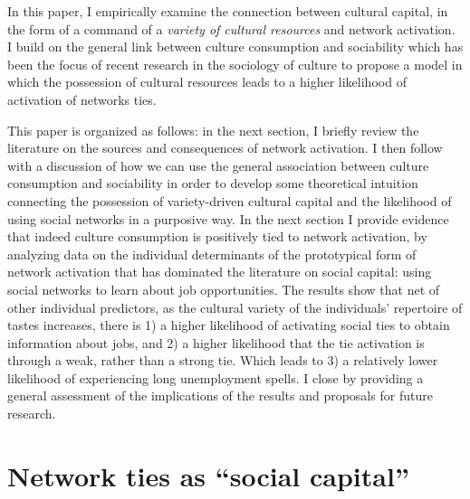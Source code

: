 \documentclass[12pt]{article}
\begin{document}
In this paper, I empirically examine the connection between cultural capital, in the form of a command of a \emph{variety of cultural resources } \citep{dimaggio87, erickson96, peterson_rossman08} and network activation. I build on the general link between culture consumption and sociability which has been the focus of recent research in the sociology of culture \citep{bennett_etal99, cardon_granjon05, lizardo06a, jeannotte03} to propose a model in which the possession of cultural resources leads to a higher likelihood of activation of networks ties.

This paper is organized as follows: in the next section, I briefly review the literature on the sources and consequences of network activation. I then follow with a discussion of how we can use the general association between culture consumption and sociability in order to develop some theoretical intuition connecting the possession of variety-driven cultural capital and the likelihood of using social networks in a purposive way. In the next section I provide evidence that indeed culture consumption is positively tied to network activation, by analyzing data on the individual determinants of the prototypical form of network activation that has dominated the literature on social capital: using social networks to learn about job opportunities. The results show that net of other individual predictors, as the cultural variety of the individuals' repertoire of tastes increases, there is 1) a higher likelihood of activating social ties to obtain information about jobs, and 2) a higher likelihood that the tie activation is through a weak, rather than a strong tie. Which leads to 3) a relatively lower likelihood of experiencing long unemployment spells. I close by providing a general assessment of the implications of the results and proposals for future research.

\section{Network ties as ``social capital''}
\end{document}
